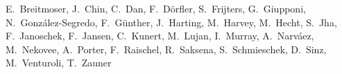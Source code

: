 %
%
%
%
%
%

E.~Breitmoser,
J.~Chin, 
C.~Dan,
F.~D\"orfler,
S.~Frijters,
G.~Giupponi,
N.~Gonz\'{a}lez-Segredo, 
F.~G\"unther,
J.~Harting, 
M.~Harvey,
M.~Hecht,
S.~Jha,
F.~Janoschek,
F.~Jansen,
C.~Kunert,
M.~Lujan,
I.~Murray,
A.~Narv\'aez,
M.~Nekovee, 
A.~Porter,
F.~Raischel,
R.~Saksena,
S.~Schmieschek,
D.~Sinz,
M.~Venturoli, 
T.~Zauner
